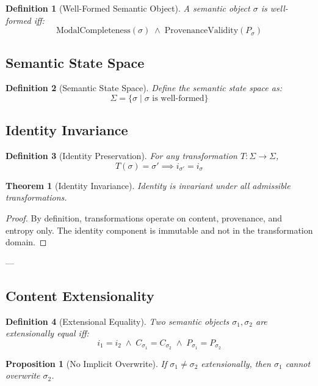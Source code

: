 \documentclass[11pt]{article}
\newtheorem{definition}{Definition}
\newtheorem{proposition}{Proposition}
\newtheorem{theorem}{Theorem}
\begin{document}
\begin{definition}[Well-Formed Semantic Object]
A semantic object $\sigma$ is well-formed iff:
\[
\text{ModalCompleteness}(\sigma) \;\wedge\; \text{ProvenanceValidity}(P_\sigma)
\]
\end{definition}

\subsection{Semantic State Space}

\begin{definition}[Semantic State Space]
Define the semantic state space as:
\[
\Sigma = \{ \sigma \mid \sigma \text{ is well-formed} \}
\]
\end{definition}

\subsection{Identity Invariance}

\begin{definition}[Identity Preservation]
For any transformation $T : \Sigma \to \Sigma$,
\[
T(\sigma) = \sigma' \implies i_{\sigma'} = i_\sigma
\]
\end{definition}

\begin{theorem}[Identity Invariance]
Identity is invariant under all admissible transformations.
\end{theorem}

\begin{proof}
By definition, transformations operate on content, provenance, and entropy only. The
identity component is immutable and not in the transformation domain.
\end{proof}

---

\subsection{Content Extensionality}

\begin{definition}[Extensional Equality]
Two semantic objects $\sigma_1, \sigma_2$ are extensionally equal iff:
\[
i_1 = i_2 \;\wedge\; C_{\sigma_1} = C_{\sigma_2} \;\wedge\; P_{\sigma_1} = P_{\sigma_2}
\]
\end{definition}

\begin{proposition}[No Implicit Overwrite]
If $\sigma_1 \neq \sigma_2$ extensionally, then $\sigma_1$ cannot overwrite $\sigma_2$.
\end{proposition}
\end{document}
